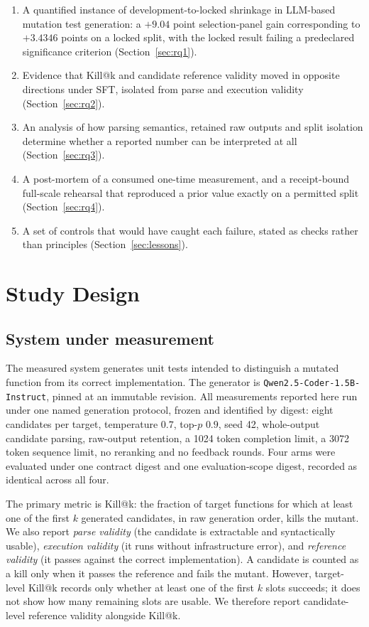 \documentclass[10pt,conference]{IEEEtran}
\makeatletter
\newcommand{\killk}[1]{Kill@#1}
\makeatother
\begin{document}
\begin{enumerate}
  \item A quantified instance of development-to-locked shrinkage in LLM-based
        mutation test generation: a $+9.04$ point selection-panel gain
        corresponding to $+3.4346$ points on a locked split, with the locked
        result failing a predeclared significance criterion
        (Section~\ref{sec:rq1}).
  \item Evidence that \killk{k} and candidate reference validity moved in
        opposite directions under SFT, isolated from parse and execution
        validity (Section~\ref{sec:rq2}).
  \item An analysis of how parsing semantics, retained raw outputs and split
        isolation determine whether a reported number can be interpreted at all
        (Section~\ref{sec:rq3}).
  \item A post-mortem of a consumed one-time measurement, and a
        receipt-bound full-scale rehearsal that reproduced a prior value exactly
        on a permitted split (Section~\ref{sec:rq4}).
  \item A set of controls that would have caught each failure, stated as
        checks rather than principles (Section~\ref{sec:lessons}).
\end{enumerate}

\section{Study Design}
\label{sec:design}

\subsection{System under measurement}

The measured system generates unit tests intended to distinguish a mutated
function from its correct implementation. The generator is
\texttt{Qwen2.5-Coder-1.5B-Instruct}, pinned at an immutable revision. All
measurements reported here run under one named generation protocol, frozen and
identified by digest: eight candidates per target, temperature $0.7$, top-$p$
$0.9$, seed 42, whole-output candidate parsing, raw-output retention, a 1024
token completion limit, a 3072 token sequence limit, no reranking and no
feedback rounds. Four arms were evaluated under one contract digest and one
evaluation-scope digest, recorded as identical across all four.

The primary metric is \killk{k}: the fraction of target functions for which at
least one of the first $k$ generated candidates, in raw generation order, kills
the mutant. We also report \emph{parse validity} (the candidate is extractable
and syntactically usable), \emph{execution validity} (it runs without
infrastructure error), and \emph{reference validity} (it passes against the
correct implementation). A candidate is counted as a kill only when it passes
the reference and fails the mutant. However, target-level \killk{k} records only
whether at least one of the first $k$ slots succeeds; it does not show how many
remaining slots are usable. We therefore report candidate-level reference
validity alongside \killk{k}.
\end{document}

